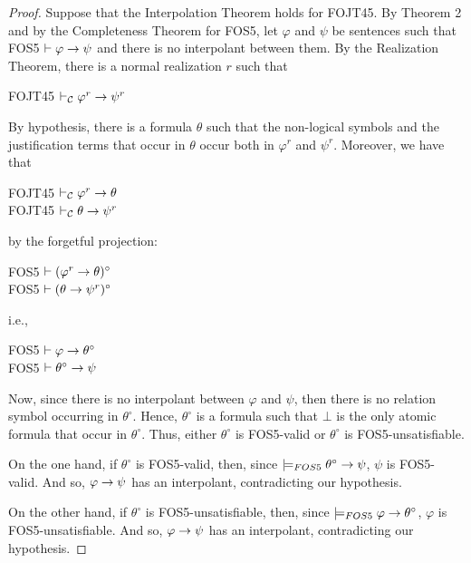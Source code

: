 \begin{proof}
Suppose that the Interpolation Theorem holds for FOJT45. By Theorem 2 and by the Completeness Theorem for FOS5, let $\varphi$ and $\psi$ be sentences such that FOS5 $\vdash \varphi \rightarrow \psi$ and there is no interpolant between them. By the Realization Theorem, there is a normal realization $r$ such that

\begin{center}
FOJT45 $\vdash_{\mathcal{C}} \varphi^{r} \rightarrow \psi^{r}$
\end{center}

\qquad By hypothesis, there is a formula $\theta$ such that the non-logical symbols and the justification terms that occur in $\theta$ occur both in $\varphi^{r}$ and $\psi^{r}$. Moreover, we have that 


\begin{center}
FOJT45 $\vdash_{\mathcal{C}} \varphi^{r} \rightarrow \theta$\\
FOJT45 $\vdash_{\mathcal{C}} \theta \rightarrow \psi^{r}$
\end{center}
by the forgetful projection: 


\begin{center}
FOS5 $\vdash (\varphi^{r} \rightarrow \theta)^{\circ}$\\
FOS5 $\vdash (\theta \rightarrow \psi^{r})^{\circ}$
\end{center}
i.e.,

\begin{center}
FOS5 $\vdash \varphi \rightarrow \theta^{\circ}$\\
FOS5 $\vdash \theta^{\circ} \rightarrow \psi$
\end{center}


\qquad Now, since there is no interpolant between $\varphi$ and $\psi$, then there is no relation symbol occurring in $\theta^{\circ}$. Hence, $\theta^{\circ}$ is a formula such that $\bot$ is the only atomic formula that occur in $\theta^{\circ}$. Thus, either $\theta^{\circ}$ is FOS5-valid or $\theta^{\circ}$ is FOS5-unsatisfiable.

\qquad On the one hand, if $\theta^{\circ}$ is FOS5-valid, then, since $\models_{FOS5} \theta^{\circ}\rightarrow \psi$, $\psi$ is FOS5-valid. And so, $\varphi \rightarrow \psi$ has an interpolant, contradicting our hypothesis.

\qquad On the other hand, if $\theta^{\circ}$ is FOS5-unsatisfiable, then, since $\models_{FOS5} \varphi \rightarrow \theta^{\circ}$, $\varphi$ is FOS5-unsatisfiable. And so, $\varphi \rightarrow \psi$ has an interpolant, contradicting our hypothesis.
\end{proof}

